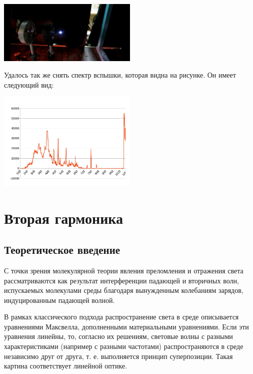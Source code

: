 \documentclass[twocolumn]{article}
\begin{document}
    
       
    \begin{center}
    \includegraphics[width=0.5\textwidth]{LEMPH Report_files/LEMPH Report_40_0.jpeg}
    \par
    \end{center}
    
        
        
    
Удалось так же снять спектр вспышки, которая видна на рисунке. Он имеет
следующий вид:


    
      
    \begin{center}
    \includegraphics[width=0.5\textwidth]{LEMPH Report_files/LEMPH Report_42_0.jpeg}
    \par
    \end{center}
                
        
    
\section{Вторая гармоника}
\subsection{Теоретическое введение}С точки зрения молекулярной теории явления преломления и отражения света
рассматриваются как результат интерференции падающей и вторичных волн,
испускаемых молекулами среды благодаря вынужденным колебаниям зарядов,
индуцированным падающей волной.

В рамках классического подхода распространение света в среде описывается
уравнениями Максвелла, дополненными материальными уравнениями. Если эти
уравнения линейны, то, согласно их решениям, световые волны с разными
характеристиками (например с разными частотами) распространяются в среде
независимо друг от друга, т. е. выполняется принцип суперпозиции. Такая
картина соответствует линейной оптике.
\end{document}

